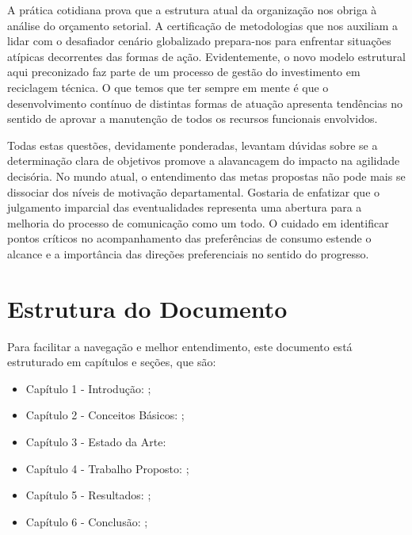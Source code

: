 A prática cotidiana prova que a estrutura atual da organização nos obriga à análise do orçamento setorial. A certificação de metodologias que nos auxiliam a lidar com o desafiador cenário globalizado prepara-nos para enfrentar situações atípicas decorrentes das formas de ação. Evidentemente, o novo modelo estrutural aqui preconizado faz parte de um processo de gestão do investimento em reciclagem técnica. O que temos que ter sempre em mente é que o desenvolvimento contínuo de distintas formas de atuação apresenta tendências no sentido de aprovar a manutenção de todos os recursos funcionais envolvidos.

Todas estas questões, devidamente ponderadas, levantam dúvidas sobre se a determinação clara de objetivos promove a alavancagem do impacto na agilidade decisória. No mundo atual, o entendimento das metas propostas não pode mais se dissociar dos níveis de motivação departamental. Gostaria de enfatizar que o julgamento imparcial das eventualidades representa uma abertura para a melhoria do processo de comunicação como um todo. O cuidado em identificar pontos críticos no acompanhamento das preferências de consumo estende o alcance e a importância das direções preferenciais no sentido do progresso.

\section{Estrutura do Documento}

Para facilitar a navegação e melhor entendimento, este documento está
estruturado em capítulos e seções, que são:
\begin{itemize}
\item {Capítulo 1 - Introdução}: \cite{Yu:2004:ESG:1015090.1015207};
\item {Capítulo 2 - Conceitos Básicos}: \cite{Cormen:2009};
\item {Capítulo 3 - Estado da Arte}: \cite{Weicker:1984:DSS:358274.358283}
\item {Capítulo 4 - Trabalho Propost}o: \cite{IEEE_802_11:6178212};
\item {Capítulo 5 - Resultados}: \cite{Linux:402081};
\item {Capítulo 6 - Conclusão}: \cite{SBC:2012};
\end{itemize}
